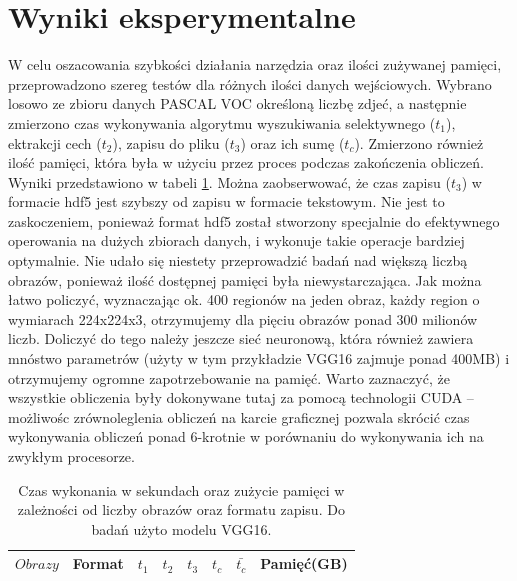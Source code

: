 \documentclass[a4paper,twoside,12pt]{book}
\begin{document}
{\section{Wyniki eksperymentalne}
{W celu oszacowania szybkości działania narzędzia oraz ilości zużywanej pamięci, przeprowadzono szereg testów dla różnych ilości danych wejściowych. Wybrano losowo ze zbioru danych PASCAL VOC określoną liczbę zdjeć, a następnie zmierzono czas wykonywania algorytmu wyszukiwania selektywnego ($t_1$), ektrakcji cech  ($t_2$), zapisu do pliku ($ t_3$) oraz ich sumę  ($ t_c$). Zmierzono również ilość pamięci, która była w użyciu przez proces podczas zakończenia obliczeń. Wyniki przedstawiono w tabeli \ref{wyniki}. }
{Można zaobserwować, że czas zapisu ($t_3$) w formacie hdf5 jest szybszy od zapisu w formacie tekstowym. Nie jest to zaskoczeniem, ponieważ format hdf5 został stworzony specjalnie do efektywnego operowania na dużych zbiorach danych, i wykonuje takie operacje bardziej optymalnie. Nie udało się niestety przeprowadzić badań nad większą liczbą obrazów, ponieważ ilość dostępnej pamięci była niewystarczająca. Jak można łatwo policzyć, wyznaczając ok. 400 regionów na jeden obraz, każdy region o wymiarach 224x224x3, otrzymujemy dla pięciu obrazów ponad 300 milionów liczb. Doliczyć do tego należy jeszcze sieć neuronową, która również zawiera mnóstwo parametrów (użyty w tym przykładzie VGG16 zajmuje ponad 400MB) i otrzymujemy ogromne zapotrzebowanie na pamięć. Warto zaznaczyć, że wszystkie obliczenia były dokonywane tutaj za pomocą technologii CUDA – możliwośc zrównoleglenia obliczeń na karcie graficznej pozwala skrócić czas wykonywania obliczeń ponad 6-krotnie w porównaniu do wykonywania ich na zwykłym procesorze.}
\begin{table}[h!]
\centering
\caption{Czas wykonania w sekundach oraz zużycie pamięci w zależności od liczby obrazów oraz formatu zapisu. Do badań użyto modelu VGG16.}
\label{wyniki}
\begin{tabular}{|c|c|c|c|c|c|c|c|}
\toprule	
	$Obrazy $ &Format &       $t_1$ & $t_2$ & $t_3$ & $t_c$& $\bar{t_c}$ & Pamięć(GB) \\
\midrule  


\end{tabular}
\end{table}}
\end{document}
